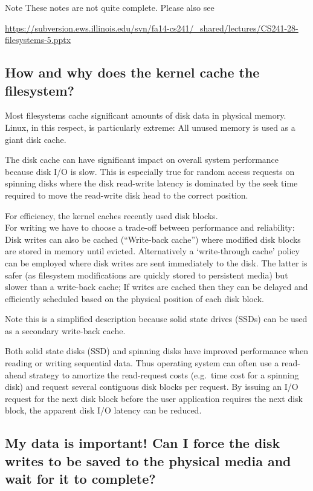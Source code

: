 Note These notes are not quite complete. Please also see

\url{https://subversion.ews.illinois.edu/svn/fa14-cs241/_shared/lectures/CS241-28-filesystems-5.pptx}

\subsection{How and why does the kernel cache the
filesystem?}\label{how-and-why-does-the-kernel-cache-the-filesystem}

Most filesystems cache significant amounts of disk data in physical
memory.\\Linux, in this respect, is particularly extreme: All unused
memory is used as a giant disk cache.

The disk cache can have significant impact on overall system performance
because disk I/O is slow. This is especially true for random access
requests on spinning disks where the disk read-write latency is
dominated by the seek time required to move the read-write disk head to
the correct position.

For efficiency, the kernel caches recently used disk blocks.\\For
writing we have to choose a trade-off between performance and
reliability: Disk writes can also be cached (``Write-back cache'') where
modified disk blocks are stored in memory until evicted. Alternatively a
`write-through cache' policy can be employed where disk writes are sent
immediately to the disk. The latter is safer (as filesystem
modifications are quickly stored to persistent media) but slower than a
write-back cache; If writes are cached then they can be delayed and
efficiently scheduled based on the physical position of each disk block.

Note this is a simplified description because solid state drives (SSDs)
can be used as a secondary write-back cache.

Both solid state disks (SSD) and spinning disks have improved
performance when reading or writing sequential data. Thus operating
system can often use a read-ahead strategy to amortize the read-request
costs (e.g.~time cost for a spinning disk) and request several
contiguous disk blocks per request. By issuing an I/O request for the
next disk block before the user application requires the next disk
block, the apparent disk I/O latency can be reduced.

\subsection{My data is important! Can I force the disk writes to be
saved to the physical media and wait for it to
complete?}\label{my-data-is-important-can-i-force-the-disk-writes-to-be-saved-to-the-physical-media-and-wait-for-it-to-complete}

